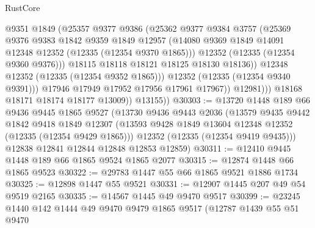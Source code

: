 \begin{lexlean}{RustCore}
\begin{coremodule}
                          @9351
                          @1849
                          (@25357
                            @9377
                            @9386
                            (@25362
                              @9377
                              @9384
                              @3757
                              (@25369
                                @9376
                                @9383
                                @1842
                                @9359
                                @1849
                                @12957
                                (@14080
                                  @9369
                                  @1849
                                  @14091
                                  @12348
                                  @12352
                                  (@12335 (@12354 @9370 @1865)))
                                @12352
                                (@12335 (@12354 @9360 @9376)))
                              @18115
                              @18118
                              @18121
                              @18125
                              @18130
                              @18136))
                          @12348
                          @12352
                          (@12335 (@12354 @9352 @1865)))
                        @12352
                        (@12335 (@12354 @9340 @9391)))
                      @17946
                      @17949
                      @17952
                      @17956
                      @17961
                      @17967))
                  @12981)))
            @18168
            @18171
            @18174
            @18177
            @13009))
        @13155))
@30303 := @13720
    @1448
    @189
    @66
    @9436
    @9445
    @1865
    @9527
    (@13730
      @9436
      @9443
      @2036
      (@13579
        @9435
        @9442
        @1842
        @9418
        @1849
        @12307
        (@13593 @9428 @1849 @13604 @12348 @12352 (@12335 (@12354 @9429 @1865)))
        @12352
        (@12335 (@12354 @9419 @9435)))
      @12838
      @12841
      @12844
      @12848
      @12853
      @12859)
@30311 := @12410 @9445 @1448 @189 @66 @1865 @9524 @1865 @2077
@30315 := @12874 @1448 @66 @1865 @9523
@30322 := @29783 @1447 @55 @66 @1865 @9521 @1886 @1734
@30325 := @12898 @1447 @55 @9521
@30331 := @12907 @1445 @207 @49 @54 @9519 @2165
@30335 := @14567 @1445 @49 @9470 @9517
@30399 := @23245
    @1440
    @142
    @1444
    @49
    @9470
    @9479
    @1865
    @9517
    (@12787
      @1439
      @55
      @51
      @9470

\end{coremodule}
\end{lexlean}

